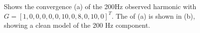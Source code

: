 \begin{figure}[h!]
  \centering %
  \qquad
  \caption{\label{fig:ph_lowgain} Shows the convergence (a) of the 200Hz observed harmonic with $G = [1, 0, 0, 0, 0, 0, 10, 0, 8, 0, 10, 0]^T$. The \abbrFFT of (a) is shown in (b), showing a clean model of the 200 Hz component.}
\end{figure}

